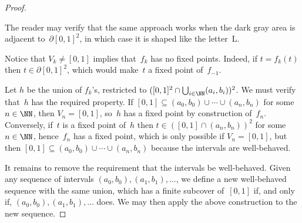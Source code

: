 \begin{proof}
\begin{enumerate}
    The reader may verify that the same approach works when the dark gray area is adjacent to~$\partial[0,1]^2$, in which case it is shaped like the letter~L.
  \end{enumerate}
  Notice that $V_k \neq [0,1]$ implies that~$f_k$ has no fixed points. Indeed, if $t = f_k(t)$ then $t \in \partial[0,1]^2$, which would make~$t$ a fixed point of~$f_{-1}$.

  Let $h$ be the union of $f_k$'s, restricted to $([0,1]^2 \cap \bigcup_{i \in \NN} (a_i, b_i))^2$.
  We must verify that~$h$ has the required property.
  If $[0,1] \subseteq (a_0, b_0) \cup \cdots \cup (a_n, b_n)$ for some $n \in \NN$, then $V_n = [0,1]$, so~$h$ has a fixed point by construction of~$f_n$.
  Conversely, if~$t$ is a fixed point of~$h$ then $t \in ([0,1] \cap (a_n, b_n))^2$ for some~$n \in \NN$, hence~$f_n$ has a fixed point, which is only possible if $V_n = [0,1]$, but then $[0,1] \subseteq (a_0, b_0) \cup \cdots \cup (a_n, b_n)$ because the intervals are well-behaved.


  It remains to remove the requirement that the intervals be well-behaved.
  Given any sequence of intervals $(a_0, b_0), (a_1, b_1), \ldots$, we define a new well-behaved sequence with the same union, which has a finite subcover of~$[0,1]$ if, and only if, $(a_0, b_0), (a_1, b_1), \ldots$ does.
  We may then apply the above construction to the new sequence.


\end{proof}
